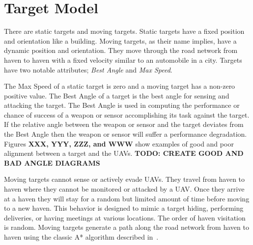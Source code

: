 \chapter{Target Model}
There are static targets and moving targets.  Static targets have a fixed position and orientation like a building.  Moving targets, as their name implies, have a dynamic position and orientation.  They move through the road network from haven to haven with a fixed velocity similar to an automobile in a city.  Targets have two notable attributes; \textit{Best Angle} and \textit{Max Speed}.

The Max Speed of a static target is zero and a moving target has a non-zero positive value.  The Best Angle of a target is the best angle for sensing and attacking the target.  The Best Angle is used in computing the performance or chance of success of a weapon or sensor accomplishing its task against the target.  If the relative angle between the weapon or sensor and the target deviates from the Best Angle then the weapon or sensor will suffer a performance degradation.  Figures \textbf{XXX, YYY, ZZZ, and WWW} show examples of good and poor alignment between a target and the UAVs. \textbf{TODO: CREATE GOOD AND BAD ANGLE DIAGRAMS}


Moving targets cannot sense or actively evade UAVs.  They travel from haven to haven where they cannot be monitored or attacked by a UAV.  Once they arrive at a haven they will stay for a random but limited amount of time before moving to a new haven.  This behavior is designed to mimic a target hiding, performing deliveries, or having meetings at various locations.  The order of haven visitation is random.  Moving targets generate a path along the road network from haven to haven using the classic A* algorithm described in~\cite{wiki:astar}.

